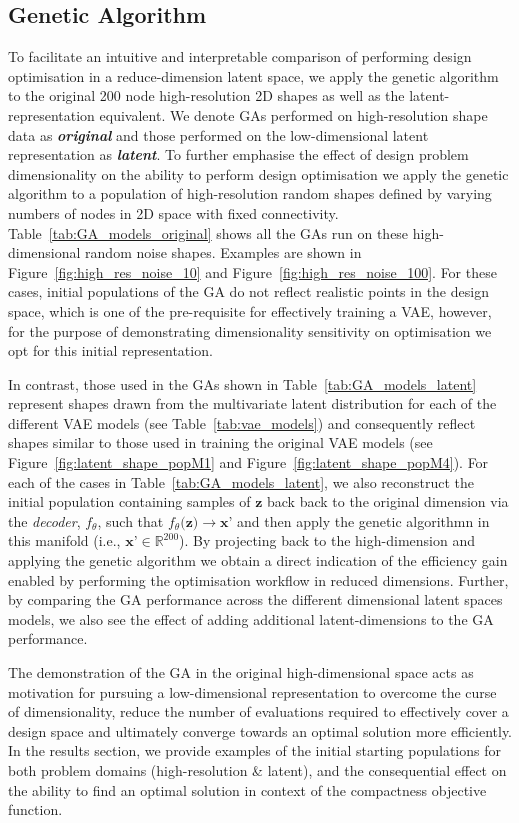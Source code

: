 \documentclass{article}
\begin{document}
\subsection{Genetic Algorithm}
To facilitate an intuitive and interpretable comparison of performing design optimisation in a reduce-dimension latent space, we apply the genetic algorithm to the original 200 node high-resolution 2D shapes as well as the latent-representation equivalent. We denote GAs performed on high-resolution shape data as \textbf{\textit{original}} and those performed on the low-dimensional latent representation as \textbf{\textit{latent}}. To further emphasise the effect of design problem dimensionality on the ability to perform design optimisation we apply the genetic algorithm to a population of high-resolution random shapes defined by varying numbers of nodes in 2D space with fixed connectivity. Table~\ref{tab:GA_models_original} shows all the GAs run on these high-dimensional random noise shapes. Examples are shown in Figure~\ref{fig:high_res_noise_10} and Figure~\ref{fig:high_res_noise_100}. For these cases, initial populations of the GA do not  reflect realistic points in the design space, which is one of the pre-requisite for effectively training a VAE, however, for the purpose of demonstrating dimensionality sensitivity on optimisation we opt for this initial representation.

In contrast, those used in the GAs shown in Table~\ref{tab:GA_models_latent} represent shapes drawn from the multivariate latent distribution for each of the different VAE models (see Table~\ref{tab:vae_models}) and consequently reflect shapes similar to those used in training the original VAE models (see Figure~\ref{fig:latent_shape_popM1} and Figure~\ref{fig:latent_shape_popM4}). For each of the cases in Table~\ref{tab:GA_models_latent}, we also reconstruct the initial population containing samples of $\textbf{z}$ back back to the original dimension via the \textit{decoder}, $f_\theta$, such that $f_\theta(\textbf{z)}\rightarrow\textbf{x'}$ and then apply the genetic algorithmn in this manifold (i.e., $\textbf{x'}\in \mathbb{R}^{200}$). By projecting back to the high-dimension and applying the genetic algorithm we obtain a direct indication of the efficiency gain enabled by performing the optimisation workflow in reduced dimensions. Further, by comparing the GA performance across the different dimensional latent spaces models, we also see the effect of adding additional latent-dimensions to the GA performance.

The demonstration of the GA in the original high-dimensional space acts as motivation for pursuing a low-dimensional representation to overcome the curse of dimensionality, reduce the number of evaluations required to effectively cover a design space and ultimately converge towards an optimal solution more efficiently. In the results section, we provide examples of the initial starting populations for both problem domains (high-resolution \& latent), and the consequential effect on the ability to find an optimal solution in context of the compactness objective function.
\end{document}
